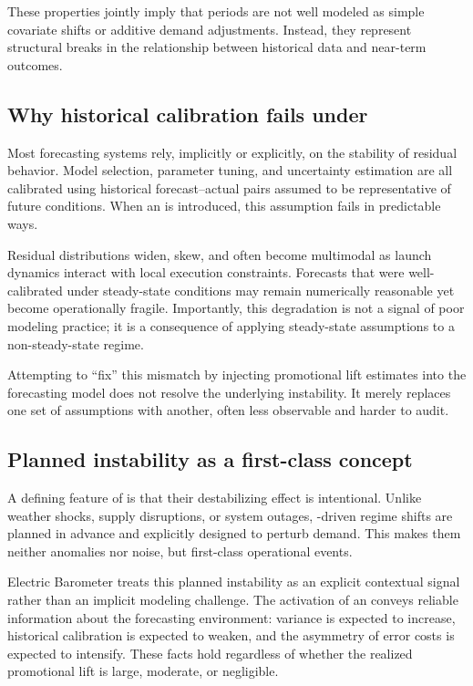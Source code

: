 These properties jointly imply that \LTO{} periods are not well modeled as simple covariate shifts
or additive demand adjustments. Instead, they represent structural breaks in the relationship
between historical data and near-term outcomes.

\subsection{Why historical calibration fails under \LTOs{}}
\label{subsec:calibration-failure}

Most forecasting systems rely, implicitly or explicitly, on the stability of residual behavior. Model
selection, parameter tuning, and uncertainty estimation are all calibrated using historical
forecast--actual pairs assumed to be representative of future conditions. When an \LTO{} is
introduced, this assumption fails in predictable ways.

Residual distributions widen, skew, and often become multimodal as launch dynamics interact with
local execution constraints. Forecasts that were well-calibrated under steady-state conditions may
remain numerically reasonable yet become operationally fragile. Importantly, this degradation is
not a signal of poor modeling practice; it is a consequence of applying steady-state assumptions
to a non-steady-state regime.

Attempting to ``fix'' this mismatch by injecting promotional lift estimates into the forecasting model
does not resolve the underlying instability. It merely replaces one set of assumptions with another,
often less observable and harder to audit.

\subsection{Planned instability as a first-class concept}
\label{subsec:planned-instability}

A defining feature of \LTOs{} is that their destabilizing effect is intentional. Unlike weather shocks,
supply disruptions, or system outages, \LTO{}-driven regime shifts are planned in advance and
explicitly designed to perturb demand. This makes them neither anomalies nor noise, but
first-class operational events.

Electric Barometer treats this planned instability as an explicit contextual signal rather than an
implicit modeling challenge. The activation of an \LTO{} conveys reliable information about the
forecasting environment: variance is expected to increase, historical calibration is expected to
weaken, and the asymmetry of error costs is expected to intensify. These facts hold regardless of
whether the realized promotional lift is large, moderate, or negligible.


